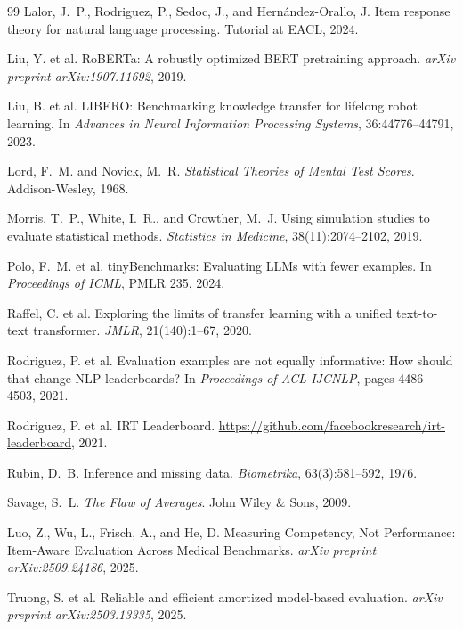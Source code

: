 \documentclass[11pt,a4paper]{article}
\begin{document}
\begin{thebibliography}{99}
 Lalor, J.~P., Rodriguez, P., Sedoc, J., and Hern\'{a}ndez-Orallo, J. Item response theory for natural language processing. Tutorial at EACL, 2024.

 Liu, Y. et al. RoBERTa: A robustly optimized BERT pretraining approach. \emph{arXiv preprint arXiv:1907.11692}, 2019.

 Liu, B. et al. LIBERO: Benchmarking knowledge transfer for lifelong robot learning. In \emph{Advances in Neural Information Processing Systems}, 36:44776--44791, 2023.

 Lord, F.~M. and Novick, M.~R. \emph{Statistical Theories of Mental Test Scores}. Addison-Wesley, 1968.

 Morris, T.~P., White, I.~R., and Crowther, M.~J. Using simulation studies to evaluate statistical methods. \emph{Statistics in Medicine}, 38(11):2074--2102, 2019.

 Polo, F.~M. et al. tinyBenchmarks: Evaluating LLMs with fewer examples. In \emph{Proceedings of ICML}, PMLR 235, 2024.

 Raffel, C. et al. Exploring the limits of transfer learning with a unified text-to-text transformer. \emph{JMLR}, 21(140):1--67, 2020.

 Rodriguez, P. et al. Evaluation examples are not equally informative: How should that change NLP leaderboards? In \emph{Proceedings of ACL-IJCNLP}, pages 4486--4503, 2021.

 Rodriguez, P. et al. IRT Leaderboard. \url{https://github.com/facebookresearch/irt-leaderboard}, 2021.

 Rubin, D.~B. Inference and missing data. \emph{Biometrika}, 63(3):581--592, 1976.

 Savage, S.~L. \emph{The Flaw of Averages}. John Wiley \& Sons, 2009.

 Luo, Z., Wu, L., Frisch, A., and He, D. Measuring Competency, Not Performance: Item-Aware Evaluation Across Medical Benchmarks. \emph{arXiv preprint arXiv:2509.24186}, 2025.

 Truong, S. et al. Reliable and efficient amortized model-based evaluation. \emph{arXiv preprint arXiv:2503.13335}, 2025.


\end{thebibliography}
\end{document}
